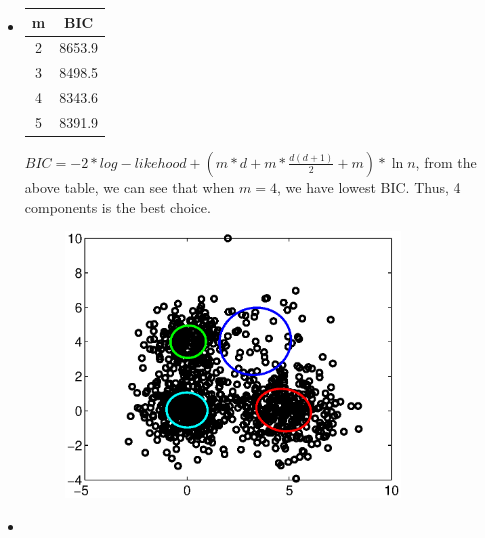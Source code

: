 \documentclass{article}
\theoremstyle{definition}
\theoremstyle{definition}
\theoremstyle{remark}
\begin{document}
\begin{itemize}
\item
\begin{table}[!htp]
\centering
\begin{tabular}{|c|c|}
\hline
 m & BIC \\
\hline
2 & 8653.9 \\
\hline
3 & 8498.5 \\
\hline
4 & 8343.6 \\
\hline
5 & 8391.9 \\
\hline
\end{tabular}
\end{table}

$BIC = -2*log-likehood + (m*d+m*\frac{d(d+1)}{2}+m)*\ln n$, from the above table, we can see that when $m=4$, we have lowest BIC. Thus, 4 components is the best choice.
\begin{figure}[!htbp]
  \centering
  \includegraphics[width=3.5in]{1.eps}\\
\end{figure}

\item


\end{itemize}
\end{document}
